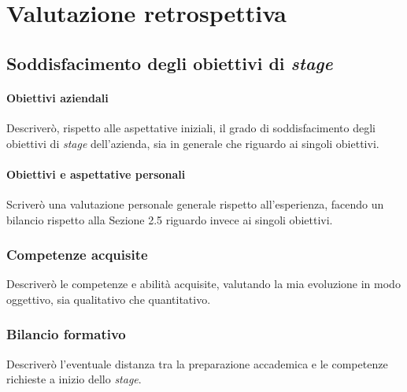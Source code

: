 \chapter{Valutazione retrospettiva}
    \section{Soddisfacimento degli obiettivi di \textit{stage}}
        \subsubsection{Obiettivi aziendali}
        Descriverò, rispetto alle aspettative iniziali, il grado di soddisfacimento degli obiettivi di \textit{stage} dell'azienda, sia in generale che riguardo ai singoli obiettivi. 
        \subsubsection{Obiettivi e aspettative personali}
        Scriverò una valutazione personale generale rispetto all'esperienza, facendo un bilancio rispetto alla Sezione 2.5 riguardo invece ai singoli obiettivi. 
    \subsection{Competenze acquisite}
    Descriverò le competenze e abilità acquisite, valutando la mia evoluzione in modo oggettivo, sia qualitativo che quantitativo. 
    \subsection{Bilancio formativo}
    Descriverò l'eventuale distanza tra la preparazione accademica e le competenze richieste a inizio dello \textit{stage}.